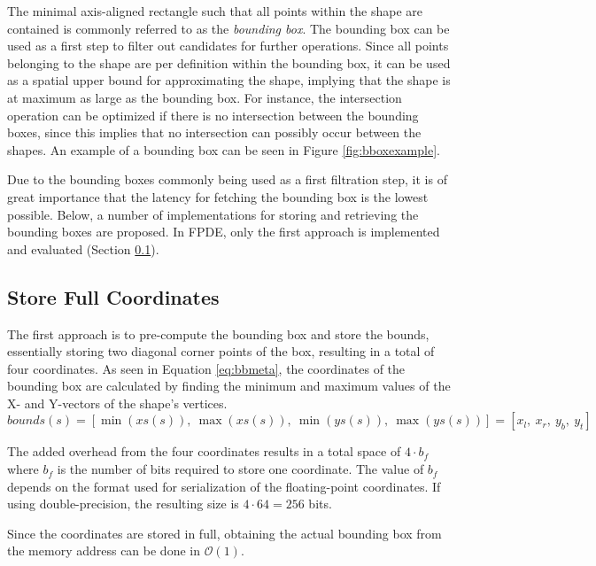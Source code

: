 The minimal axis-aligned rectangle such that all points within the shape are contained is commonly referred to as the \emph{bounding box}. The bounding box can be used as a first step to filter out candidates for further operations. Since all points belonging to the shape are per definition within the bounding box, it can be used as a spatial upper bound for approximating the shape, implying that the shape is at maximum as large as the bounding box. For instance, the intersection operation can be optimized if there is no intersection between the bounding boxes, since this implies that no intersection can possibly occur between the shapes. An example of a bounding box can be seen in Figure \ref{fig:bboxexample}. 

Due to the bounding boxes commonly being used as a first filtration step, it is of great importance that the latency for fetching the bounding box is the lowest possible. Below, a number of implementations for storing and retrieving the bounding boxes are proposed. In FPDE, only the first approach is implemented and evaluated (Section \ref{sec:bboxfull}).

\subsection{Store Full Coordinates}\label{sec:bboxfull}
The first approach is to pre-compute the bounding box and store the bounds, essentially storing two diagonal corner points of the box, resulting in a total of four coordinates. As seen in Equation \ref{eq:bbmeta}, the coordinates of the bounding box are calculated by finding the minimum and maximum values of the X- and Y-vectors of the shape's vertices.
\begin{equation}
    bounds(s)=[\min(xs(s)),\ \max(xs(s)),\ \min(ys(s)),\ \max(ys(s))] = [x_l,\ x_r,\ y_b,\ y_t]
    \label{eq:bbmeta}
\end{equation}

The added overhead from the four coordinates results in a total space of $4 \cdot b_f$ where $b_f$ is the number of bits required to store one coordinate. The value of $b_f$ depends on the format used for serialization of the floating-point coordinates. If using double-precision, the resulting size is $4 \cdot 64 = 256$ bits.

Since the coordinates are stored in full, obtaining the actual bounding box from the memory address can be done in $\mathcal{O}(1)$.

